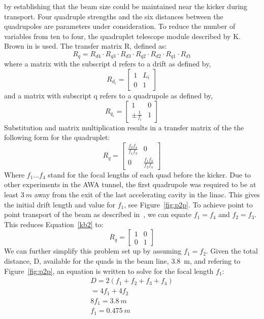 by establishing that the beam size could be maintained near the kicker during transport.  
Four quadruple strengths and the six distances between the quadrupoles are parameters under consideration. 
To reduce the number of variables from ten to four, 
the quadruplet telescope module described by K. Brown in \cite{brown} is used.  
The transfer matrix R, defined as:  
\begin{equation}
R_q = R_{d4} \cdot R_{q3} \cdot R_{d3} \cdot R_{q2} \cdot R_{d2} \cdot R_{q1} \cdot R_{d1} 
\label{kb1}
\end{equation}
where a matrix with the subscript d refers to a drift as defined by,
\begin{equation}
R_{d_i} = 
\begin{bmatrix}
1 & L_i \\
0 & 1
\end{bmatrix}
\end{equation}
and a matrix with subscript q refers to a quadrupole as defined by,
\begin{equation}
R_{q_i} = 
\begin{bmatrix}
1 & 0 \\
\pm \frac{1}{f_i} & 1
\end{bmatrix}
\end{equation}
Substitution and matrix multiplication results in a transfer matrix of the 
the following form for the quadruplet:
\begin{equation}
R_q = 
\begin{bmatrix}
\frac{f_2 f_4}{f_1 f_3} & 0 \\
0 & \frac{f_1 f_3}{f_2 f_4}	
\end{bmatrix}\label{kb2}
\end{equation}
Where $f_1 \ldots f_4$ stand for the focal lengths of each quad before the kicker. 
Due to other experiments in the AWA tunnel, 
the first quadrupole was required to be at least $\SI{3}{m}$ away from the exit of the 
last accelerating cavity in the linac. This gives the initial drift length and value
for $f_1$, see Figure~\ref{fig:p2p}.
To achieve point to point transport of the beam as described in~\cite{brown}, 
we can equate $f_1 = f_4$ and $f_2 = f_3$. This reduces Equation~\ref{kb2} to:
\begin{equation}
R_q =
\begin{bmatrix}
1 & 0 \\
0 & 1	
\end{bmatrix}
\end{equation}
We can further simplify this problem set up by 
assuming $f_1=f_2$. 
Given the total distance, D, available for the
quads in the beam line, \SI{3.8}{m}, and refering to Figure~\ref{fig:p2p}, 
an equation is written to solve for the focal length $f_1$: 
\begin{align}
D = 2 \left(f_1+f_2+f_3+f_4\right)\\
= 4f_1 + 4 f_2 \\
8f_1 = \SI{3.8}{m} \\
f_1 = \SI{0.475}{m}
\end{align}

